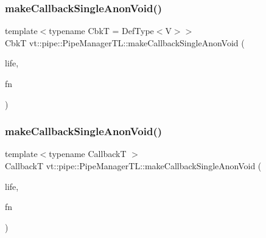 \subsubsection{\texorpdfstring{make\+Callback\+Single\+Anon\+Void()}{makeCallbackSingleAnonVoid()}\hspace{0.1cm}{\footnotesize\ttfamily [1/2]}}
{\footnotesize\ttfamily template$<$typename CbkT  = Def\+Type$<$\+V$>$$>$ \\
CbkT vt\+::pipe\+::\+Pipe\+Manager\+T\+L\+::make\+Callback\+Single\+Anon\+Void (\begin{DoxyParamCaption}\item[{\hyperlink{namespacevt_1_1pipe_acb42b284378c0fdac1d7c6335dc26f58}{Lifetime\+Enum}}]{life,  }\item[{\hyperlink{structvt_1_1pipe_1_1_pipe_manager_base_acd6f0c71f38f08d53f85e83b65406d77}{Func\+Void\+Type}}]{fn }\end{DoxyParamCaption})}

\mbox{\label{structvt_1_1pipe_1_1_pipe_manager_t_l_a92e209618d7e21e150a1f13ae4e813d4}} 
\subsubsection{\texorpdfstring{make\+Callback\+Single\+Anon\+Void()}{makeCallbackSingleAnonVoid()}\hspace{0.1cm}{\footnotesize\ttfamily [2/2]}}
{\footnotesize\ttfamily template$<$typename CallbackT $>$ \\
CallbackT vt\+::pipe\+::\+Pipe\+Manager\+T\+L\+::make\+Callback\+Single\+Anon\+Void (\begin{DoxyParamCaption}\item[{\hyperlink{namespacevt_1_1pipe_acb42b284378c0fdac1d7c6335dc26f58}{Lifetime\+Enum}}]{life,  }\item[{\hyperlink{structvt_1_1pipe_1_1_pipe_manager_base_acd6f0c71f38f08d53f85e83b65406d77}{Func\+Void\+Type}}]{fn }\end{DoxyParamCaption})}

\mbox{\label{structvt_1_1pipe_1_1_pipe_manager_t_l_a1c5332868e96ae95eaa99bf7d755a6a1}} 
